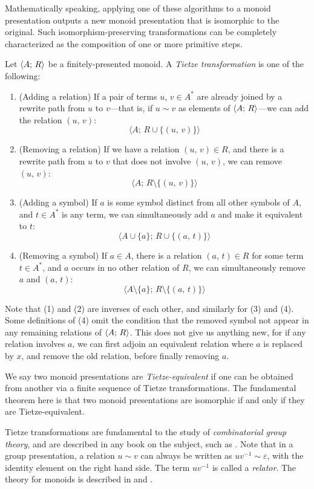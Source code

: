 \documentclass[../generics]{subfiles}
\begin{document}
Mathematically speaking, applying one of these algorithms to a monoid presentation outputs a new monoid presentation that is isomorphic to the original. Such isomorphism-preserving transformations can be completely characterized as the composition of one or more primitive steps.

\begin{definition}
Let $\langle A;\,R\rangle$ be a finitely-presented monoid. A \emph{Tietze transformation} is one of the following:
\begin{enumerate}
\item (Adding a relation) If a pair of terms $u$, $v\in A^*$ are already joined by a rewrite path from $u$ to $v$---that is, if $u\sim v$ as elements of $\langle A;\,R\rangle$---we can add the relation $(u,\,v)$:
\[\langle A;\,R\cup\{(u,\,v)\}\rangle\]
\item (Removing a relation) If we have a relation $(u,\,v)\in R$, and there is a rewrite path from $u$ to $v$ that does not involve $(u,\,v)$, we can remove $(u,\,v)$:
\[\langle A;\,R\setminus\{(u,\,v)\}\rangle\]
\item (Adding a symbol) If $a$ is some symbol distinct from all other symbols of $A$, and $t\in A^*$ is any term, we can simultaneously add $a$ and make it equivalent to $t$:
\[\langle A\cup\{a\};\,R\cup\{(a,\,t)\}\rangle\]
\item (Removing a symbol) If $a\in A$, there is a relation $(a,\,t)\in R$ for some term $t\in A^*$, and $a$ occurs in no other relation of $R$, we can simultaneously remove $a$ and $(a,\,t)$:
\[\langle A\setminus\{a\};\,R\setminus\{(a,\,t)\}\rangle\]
\end{enumerate}
\end{definition}

Note that (1) and (2) are inverses of each other, and similarly for (3) and (4). Some definitions of (4) omit the condition that the removed symbol not appear in any remaining relations of $\langle A;\,R\rangle$. This does not give us anything new, for if any relation involves $a$, we can first adjoin an equivalent relation where $a$ is replaced by $x$, and remove the old relation, before finally removing $a$.

We say two monoid presentations are \emph{Tietze-equivalent} if one can be obtained from another via a finite sequence of Tietze transformations. The fundamental theorem here is that two monoid presentations are isomorphic if and only if they are Tietze-equivalent.

Tietze transformations are fundamental to the study of \emph{combinatorial group theory}, and are described in any book on the subject, such as \cite{combinatorialgroup}. Note that in a group presentation, a relation $u\sim v$ can always be written as $uv^{-1}\sim\varepsilon$, with the identity element on the right hand side. The term $uv^{-1}$ is called a \emph{relator}. The theory for monoids is described in \cite{book2012string} and \cite{henry2021tietze}.
\end{document}

